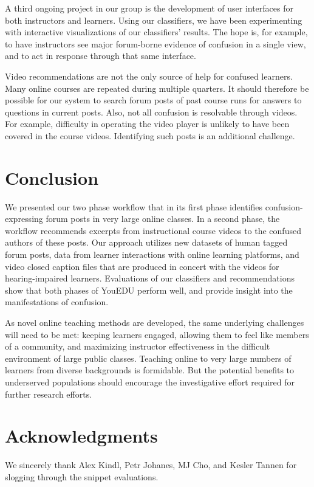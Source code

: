 \documentclass{edm_template}
\begin{document}
A third ongoing project in our group is the development of user
interfaces for both instructors and learners. Using our classifiers,
we have been experimenting with interactive visualizations of our
classifiers' results. The hope is, for example, to have instructors
see major forum-borne evidence of confusion in a single view, and to
act in response through that same interface.

Video recommendations are not the only source of help for confused
learners. Many online courses are repeated during multiple
quarters. It should therefore be possible for our system to search
forum posts of past course runs for answers to questions in current
posts.  Also, not all confusion is resolvable through videos. For
example, difficulty in operating the video player is unlikely to
have been covered in the course videos. Identifying such posts is
an additional challenge.

\section{Conclusion}
\label{sec:conclusion}
We presented our two phase workflow that in its first phase identifies
confusion-expressing forum posts in very large online classes. In a
second phase, the workflow recommends excerpts from instructional course
videos to the confused authors of these posts. Our approach utilizes new datasets
of human tagged forum posts, data from learner interactions with online learning
platforms, and video closed caption files that are produced in concert with the
videos for hearing-impaired learners. Evaluations of our classifiers and recommendations show that both phases of YouEDU perform well, and provide insight into the
manifestations of confusion.

As novel online teaching methods are developed, the same underlying
challenges will need to be met: keeping learners engaged, allowing
them to feel like members of a community, and maximizing instructor
effectiveness in the difficult environment of large public classes.
Teaching online to very large numbers of learners from diverse backgrounds is formidable.
But the potential benefits to underserved populations should encourage
the investigative effort required for further research efforts.

\section{Acknowledgments}
We sincerely thank Alex Kindl, Petr Johanes, MJ Cho, and Kesler Tannen
for slogging through the snippet evaluations.
\end{document}
